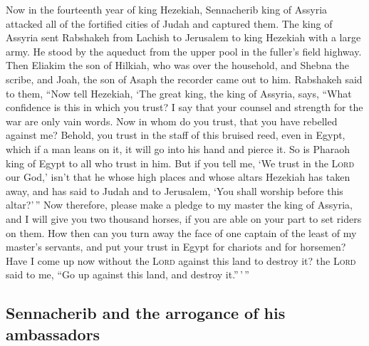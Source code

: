  Now in the fourteenth year of king Hezekiah, Sennacherib
king of Assyria attacked all of the fortified cities of Judah and
captured them.  The king of Assyria sent Rabshakeh from
Lachish to Jerusalem to king Hezekiah with a large army. He stood by the
aqueduct from the upper pool in the fuller's field highway.
 Then Eliakim the son of Hilkiah, who was over the
household, and Shebna the scribe, and Joah, the son of Asaph the
recorder came out to him.  Rabshakeh said to them, ``Now
tell Hezekiah, `The great king, the king of Assyria, says, ``What
confidence is this in which you trust?  I say that your
counsel and strength for the war are only vain words. Now in whom do you
trust, that you have rebelled against me?  Behold, you
trust in the staff of this bruised reed, even in Egypt, which if a man
leans on it, it will go into his hand and pierce it. So is Pharaoh king
of Egypt to all who trust in him.  But if you tell me, `We
trust in the \textsc{Lord} our God,' isn't that he whose high places and
whose altars Hezekiah has taken away, and has said to Judah and to
Jerusalem, `You shall worship before this altar?'\,''  Now
therefore, please make a pledge to my master the king of Assyria, and I
will give you two thousand horses, if you are able on your part to set
riders on them.  How then can you turn away the face of
one captain of the least of my master's servants, and put your trust in
Egypt for chariots and for horsemen?  Have I come up now
without the \textsc{Lord} against this land to destroy it? the
\textsc{Lord} said to me, ``Go up against this land, and destroy
it.''\,'\,''

\hypertarget{sennacherib-and-the-arrogance-of-his-ambassadors}{%
\subsection{Sennacherib and the arrogance of his
ambassadors}\label{sennacherib-and-the-arrogance-of-his-ambassadors}}

